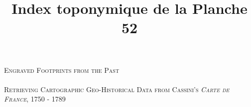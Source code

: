 \documentclass[portrait, A0]{sciposter}
\title{Index toponymique de la Planche 52}
\institute 
{EHESS
}
\begin{document}
\bgroup
\setlength{\parindent}{-0.1em} 
\Huge \textsc{Engraved Footprints from the Past}\\ \\ \Large \textsc{Retrieving Cartographic Geo-Historical Data from Cassini’s \emph{Carte de France}, 1750 - 1789}
\vspace{1cm}
\egroup

\begin{minipage}[b]{77cm}
\begin{multicols}{3}
\setlength{\columnsep}{80pt}


\end{multicols}
\end{minipage}
\end{document}
